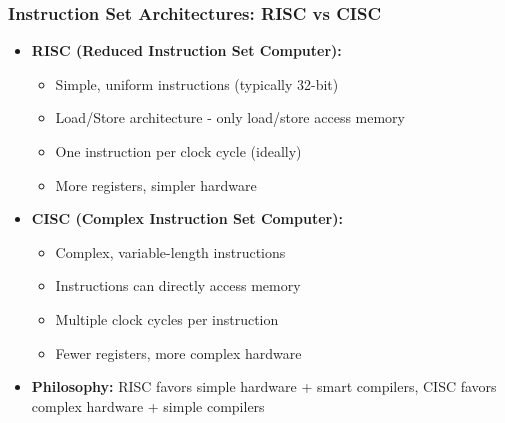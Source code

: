 \begin{frame}
\frametitle{Instruction Set Architectures: RISC vs CISC}
\begin{itemize}
    \item \textbf{RISC (Reduced Instruction Set Computer):}
    \begin{itemize}
        \item Simple, uniform instructions (typically 32-bit)
        \item Load/Store architecture - only load/store access memory
        \item One instruction per clock cycle (ideally)
        \item More registers, simpler hardware
    \end{itemize}
    \item \textbf{CISC (Complex Instruction Set Computer):}
    \begin{itemize}
        \item Complex, variable-length instructions
        \item Instructions can directly access memory
        \item Multiple clock cycles per instruction
        \item Fewer registers, more complex hardware
    \end{itemize}
    \item \textbf{Philosophy:} RISC favors simple hardware + smart compilers, CISC favors complex hardware + simple compilers
\end{itemize}
\end{frame}

